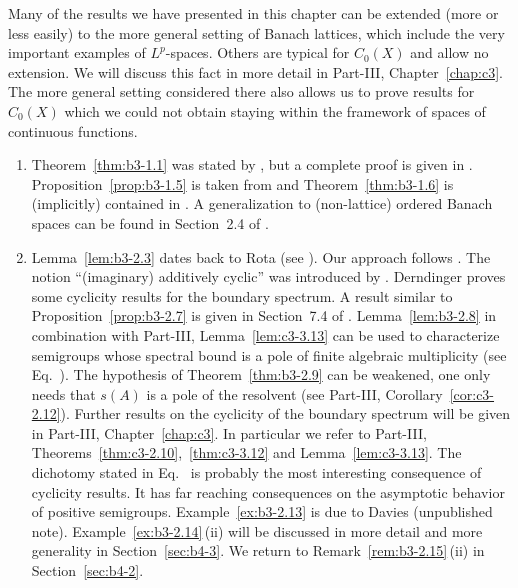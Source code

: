 Many of the results we have presented in this chapter can be extended (more or less easily) to the more general setting of Banach lattices, which include the very important examples of\/ $L^p$-spaces.
Others are typical for $C_{0}(X)$ and allow no extension.
We will discuss this fact in more detail in Part-III, Chapter~\ref{chap:c3}.
The more general setting considered there also allows us to prove results for $C_{0}(X)$ which we could not obtain staying within the framework of spaces of continuous functions.
\begin{enumerate}[label=\emph{Section 3.\arabic*:}, wide]

\item
Theorem~\ref{thm:b3-1.1} was stated by \textcite{karlin:1959}, but a complete proof is given in \textcite{derndinger:1980}.
Proposition~\ref{prop:b3-1.5}  is taken from \textcite{greiner:1982} and Theorem~\ref{thm:b3-1.6} is (implicitly) contained in \textcite{derndingernagel:1979}.
A generalization to (non-lattice) ordered Banach spaces can be found in Section~2.4 of \textcite{battyrobinson:1984}.

\item
Lemma~\ref{lem:b3-2.3} dates back to Rota (see \textcite{schaefer:1974}).
Our approach follows \textcite{greiner:1981}.
The notion \enquote{(imaginary) additively cyclic} was introduced by \textcite{derndinger:1980}.
Derndinger proves some cyclicity results for the boundary spectrum.
A result similar to Proposition~\ref{prop:b3-2.7} is given in Section~7.4 of \textcite{davies:1980}.
Lemma~\ref{lem:b3-2.8} in combination with Part-III, Lemma~\ref{lem:c3-3.13}  can be used to characterize semigroups whose spectral bound is a pole of finite algebraic multiplicity (see Eq.~).
The hypothesis of Theorem~\ref{thm:b3-2.9} can be weakened, one only needs that $s(A)$ is a pole of the resolvent (see Part-III, Corollary~\ref{cor:c3-2.12}).
Further results on the cyclicity of the boundary spectrum will be given in Part-III, Chapter~\ref{chap:c3}.
In particular we refer to Part-III, Theorems~\ref{thm:c3-2.10},~\ref{thm:c3-3.12} and Lemma~\ref{lem:c3-3.13}.
The dichotomy stated in Eq.~  is probably the most interesting consequence of cyclicity results.
It has far reaching consequences on the asymptotic behavior of positive semigroups.
Example~\ref{ex:b3-2.13} is due to Davies (unpublished note).
Example~\ref{ex:b3-2.14}\,(ii) will be discussed in more detail and more generality in Section~\ref{sec:b4-3}.
We return to Remark~\ref{rem:b3-2.15}\,(ii) in Section~\ref{sec:b4-2}.


\end{enumerate}
